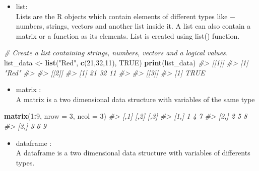 \documentclass[
]{book}
\newenvironment{Shaded}{\begin{snugshade}}{\end{snugshade}}
\newcommand{\AttributeTok}[1]{\textcolor[rgb]{0.13,0.29,0.53}{#1}}
\newcommand{\CommentTok}[1]{\textcolor[rgb]{0.56,0.35,0.01}{\textit{#1}}}
\newcommand{\ConstantTok}[1]{\textcolor[rgb]{0.56,0.35,0.01}{#1}}
\newcommand{\DecValTok}[1]{\textcolor[rgb]{0.00,0.00,0.81}{#1}}
\newcommand{\FunctionTok}[1]{\textcolor[rgb]{0.13,0.29,0.53}{\textbf{#1}}}
\newcommand{\NormalTok}[1]{#1}
\newcommand{\OtherTok}[1]{\textcolor[rgb]{0.56,0.35,0.01}{#1}}
\newcommand{\SpecialCharTok}[1]{\textcolor[rgb]{0.81,0.36,0.00}{\textbf{#1}}}
\newcommand{\StringTok}[1]{\textcolor[rgb]{0.31,0.60,0.02}{#1}}
\providecommand{\tightlist}{%
  \setlength{\itemsep}{0pt}\setlength{\parskip}{0pt}}
\begin{document}
\begin{itemize}
\tightlist
\item
  list:\\
  Lists are the R objects which contain elements of different types like − numbers, strings, vectors and another list inside it. A list can also contain a matrix or a function as its elements. List is created using list() function.
\end{itemize}

\begin{Shaded}
\begin{Highlighting}[]
\CommentTok{\# Create a list containing strings, numbers, vectors and a logical values.}
\NormalTok{list\_data }\OtherTok{\textless{}{-}} \FunctionTok{list}\NormalTok{(}\StringTok{"Red"}\NormalTok{, }\FunctionTok{c}\NormalTok{(}\DecValTok{21}\NormalTok{,}\DecValTok{32}\NormalTok{,}\DecValTok{11}\NormalTok{), }\ConstantTok{TRUE}\NormalTok{)}
\FunctionTok{print}\NormalTok{(list\_data)}
\CommentTok{\#\textgreater{} [[1]]}
\CommentTok{\#\textgreater{} [1] "Red"}
\CommentTok{\#\textgreater{} }
\CommentTok{\#\textgreater{} [[2]]}
\CommentTok{\#\textgreater{} [1] 21 32 11}
\CommentTok{\#\textgreater{} }
\CommentTok{\#\textgreater{} [[3]]}
\CommentTok{\#\textgreater{} [1] TRUE}
\end{Highlighting}
\end{Shaded}

\begin{itemize}
\tightlist
\item
  matrix :\\
  A matrix is a two dimensional data structure with variables of the same type
\end{itemize}

\begin{Shaded}
\begin{Highlighting}[]
\FunctionTok{matrix}\NormalTok{(}\DecValTok{1}\SpecialCharTok{:}\DecValTok{9}\NormalTok{, }\AttributeTok{nrow =} \DecValTok{3}\NormalTok{, }\AttributeTok{ncol =} \DecValTok{3}\NormalTok{)}
\CommentTok{\#\textgreater{}      [,1] [,2] [,3]}
\CommentTok{\#\textgreater{} [1,]    1    4    7}
\CommentTok{\#\textgreater{} [2,]    2    5    8}
\CommentTok{\#\textgreater{} [3,]    3    6    9}
\end{Highlighting}
\end{Shaded}

\begin{itemize}
\tightlist
\item
  dataframe :\\
  A dataframe is a two dimensional data structure with variables of differents types.
\end{itemize}
\end{document}
